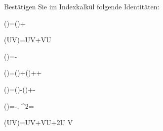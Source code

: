 \begin{atiTask}[
  title = Vektoroperatoridentitäten I
]
Bestätigen Sie im Indexkalkül folgende Identitäten:
\begin{atiSubequations}
\item{\curl (\lambda {})=(\gradient \lambda)\times {}+\lambda \curl {}}
%
\item{\gradient(UV)=U\gradient V+V\gradient U}
%
\item{\divergence (\times{})=\curl {}-\curl {}}
%
\item{\gradient()=(\gradient)+(\gradient)+\times \curl {}+\times \curl {}}
%
\item{\curl (\times {})=(\gradient )-(\gradient)+\divergence {}-\divergence {}}
%
\item{(\gradient )=-\times \curl {}, \quad {}\quad {}^2=}
\item{\Delta (UV)=U\Delta V+V\Delta U+2\gradient U \cdot \gradient V}
\end{atiSubequations}

\end{atiTask}

\begin{atiSolution}
	
\end{atiSolution}